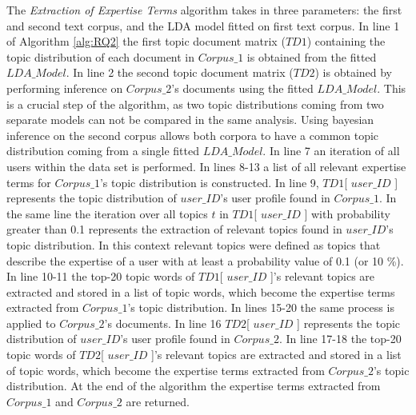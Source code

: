         The \emph{Extraction of Expertise Terms} algorithm takes in three parameters: the first and second text corpus, and the LDA model fitted on first text corpus. In line 1 of Algorithm \ref{alg:RQ2} the first topic document matrix ($TD1$) containing the topic distribution of each document in $Corpus\_1$ is obtained from the fitted $LDA\_Model$. In line 2 the second topic document matrix ($TD2$) is obtained by performing inference on $Corpus\_2$'s documents using the fitted $LDA\_Model$. This is a crucial step of the algorithm, as two topic distributions coming from two separate models can not be compared in the same analysis. Using bayesian inference on the second corpus allows both corpora to have a common topic distribution coming from a single fitted $LDA\_Model$. In line 7 an iteration of all users within the data set is performed. In lines 8-13 a list of all relevant expertise terms for $Corpus\_1$'s topic distribution is constructed. In line 9,  $TD1$[ $user\_ID$ ] represents the topic distribution of $user\_ID$'s user profile found in $Corpus\_1$. In the same line the iteration over all topics $t$ in $TD1$[ $user\_ID$ ] with probability greater than 0.1 represents the extraction of relevant topics found in $user\_ID$'s topic distribution. In this context relevant topics were defined as topics that describe the expertise of a user with at least a probability value of 0.1 (or 10 \%). In line 10-11 the top-20 topic words of $TD1$[ $user\_ID$ ]'s relevant topics are extracted and stored in a list of topic words, which become the expertise terms extracted from $Corpus\_1$'s topic distribution. In lines 15-20 the same process is applied to $Corpus\_2$'s documents. In line 16  $TD2$[ $user\_ID$ ] represents the topic distribution of $user\_ID$'s user profile found in $Corpus\_2$. In line 17-18 the top-20 topic words of $TD2$[ $user\_ID$ ]'s relevant topics are extracted and stored in a list of topic words, which become the expertise terms extracted from $Corpus\_2$'s topic distribution. At the end of the algorithm the expertise terms extracted from $Corpus\_1$ and $Corpus\_2$ are returned.
        
